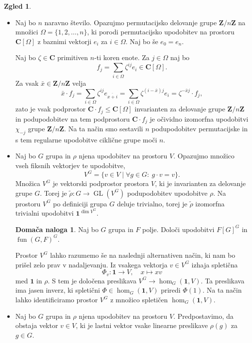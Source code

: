 \documentclass[11pt]{book}
\def\ZZ{\mathbf{Z}}
\def\CC{\mathbf{C}}
\def\oneone{\mathbf{1}}
\DeclareMathOperator\fun{fun}
\DeclareMathOperator\GL{GL}
\theoremstyle{definition}
\theoremstyle{zgled}
\newtheorem{zgled}[theorem]{Zgled}
\theoremstyle{zgledbrezstevilke}
\theoremstyle{odprtproblem}
\theoremstyle{domacanaloga}
\newtheorem{domacanaloga}[theorem]{Domača naloga}
\theoremstyle{izrek}
\begin{document}
\begin{zgled} \leavevmode
\begin{itemize}
    \item Naj bo $n$ naravno število. Opazujmo permutacijsko delovanje grupe $\ZZ/n\ZZ$ na množici $\Omega = \{ 1, 2, \dots, n \}$, ki porodi permutacijsko upodobitev na prostoru $\CC[\Omega]$ z baznimi vektorji $e_i$ za $i \in \Omega$. Naj bo še $e_0 = e_n$.
    
    Naj bo $\zeta \in \CC$ primitiven $n$-ti koren enote. Za $j \in \Omega$ naj bo
    \[
        f_j = \sum_{i \in \Omega} \zeta^{ij} e_i \in \CC[\Omega].
    \]
    Za vsak $\bar x \in \ZZ/n\ZZ$ velja
    \[
        \bar x \cdot f_j =
        \sum_{i \in \Omega} \zeta^{ij} e_{\overline{x + i}} =
        \sum_{i \in \Omega} \zeta^{(i - \bar x)j} e_{i} =
        \zeta^{-\bar x j} \cdot f_j,
    \]
    zato je vsak podprostor $\CC \cdot f_j \leq \CC[\Omega]$ invarianten za delovanje grupe $\ZZ/n\ZZ$ in podupodobitev na tem podprostoru $\CC \cdot f_j$ je očividno izomorfna upodobitvi $\chi_{-j}$ grupe $\ZZ/n\ZZ$. Na ta način smo sestavili $n$ podupodobitev permutacijske in s tem regularne upodobitve ciklične grupe moči $n$.

    \item Naj bo $G$ grupa in $\rho$ njena upodobitev na prostoru $V$. Opazujmo množico vseh fiksnih vektorjev te upodobitve,
    \[
        V^G = \{ v \in V \mid \forall g \in G \colon \ g \cdot v = v \}.
    \]
    Množica $V^G$ je vektorski podprostor prostora $V$, ki je invarianten za delovanje grupe $G$. Torej je $\tilde \rho \colon G \to \GL(V^G)$ podupodobitev upodobitve $\rho$. Na prostoru $V^G$ po definiciji grupa $G$ deluje trivialno, torej je $\tilde \rho$ izomorfna trivialni upodobitvi $\oneone^{\dim V^G}$.

    \begin{domacanaloga}
        Naj bo $G$ grupa in $F$ polje. Določi upodobitvi $F[G]^G$ in $\fun(G,F)^G$.
    \end{domacanaloga}

    Prostor $V^G$ lahko razumemo še na naslednji alternativen način, ki nam bo prišel zelo prav v nadaljevanju. Iz vsakega vektorja $v \in V^G$ izhaja spletična
    \[
        \Phi_v \colon \oneone \to V, \quad
        x \mapsto x v
    \]
    med $\oneone$ in $\rho$. S tem je določena preslikava $V^G \to \hom_G(\oneone, V)$. Ta preslikava ima jasen inverz, ki spletični $\Phi \in \hom_G(\oneone, V)$ priredi $\Phi(1)$. Na ta način lahko identificiramo prostor $V^G$ z množico spletičen $\hom_G(\oneone, V)$.
    \item Naj bo $G$ grupa in $\rho$ njena upodobitev na prostoru $V$. Predpostavimo, da obstaja vektor $v \in V$, ki je lastni vektor vsake linearne preslikave $\rho(g)$ za $g \in G$. 
    

\end{itemize}
\end{zgled}
\end{document}
